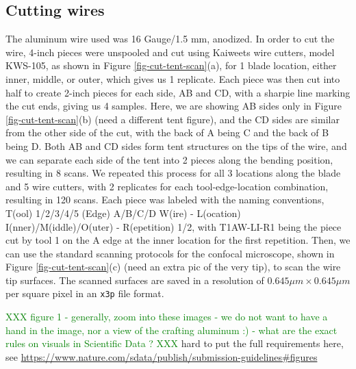 \documentclass[fleqn,10pt]{wlscirep}
\newcommand{\tom}[1]{{\textcolor{RedOrange}{#1}}}
\newcommand{\hh}[1]{{\textcolor{Green}{#1}}}
\begin{document}
\subsection{Cutting wires}\label{sec-cutting-wires}

The aluminum wire used was 16 Gauge/1.5 mm, anodized. In order to cut
the wire, 4-inch pieces were unspooled and cut using Kaiweets wire
cutters, model KWS-105, as shown in Figure \ref{fig-cut-tent-scan}(a),
for 1 blade location, either inner, middle, or outer, which gives us 1
replicate. Each piece was then cut into half to create 2-inch pieces for
each side, AB and CD, with a sharpie line marking the cut ends, giving
us 4 samples. Here, we are showing AB sides only in Figure
\ref{fig-cut-tent-scan}(b) \tom{(need a different tent figure)}, and the
CD sides are similar from the other side of the cut, with the back of A
being C and the back of B being D. Both AB and CD sides form tent
structures on the tips of the wire, and we can separate each side of the
tent into 2 pieces along the bending position, resulting in 8 scans. We
repeated this process for all 3 locations along the blade and 5 wire
cutters, with 2 replicates for each tool-edge-location combination,
resulting in 120 scans. Each piece was labeled with the naming
conventions, T(ool) 1/2/3/4/5 (Edge) A/B/C/D W(ire) - L(ocation)
I(nner)/M(iddle)/O(uter) - R(epetition) 1/2, with T1AW-LI-R1 being the
piece cut by tool 1 on the A edge at the inner location for the first
repetition. Then, we can use the standard scanning protocols for the
confocal microscope, shown in Figure \ref{fig-cut-tent-scan}(c)
\tom{(need an extra pic of the very tip)}, to scan the wire tip
surfaces. The scanned surfaces are saved in a resolution of
\(0.645 \mu m \times 0.645 \mu m\) per square pixel in an \texttt{x3p}
file format.

\hh{XXX figure 1 - generally, zoom into these images - we do not want to have a hand in the image, nor a view of the crafting aluminum :)  - what are the exact rules on visuals in Scientific Data ? XXX}
\tom{hard to put the full requirements here, see \href{https://www.nature.com/sdata/publish/submission-guidelines\#figures}{https://www.nature.com/sdata/publish/submission-guidelines\#figures}}
\end{document}
